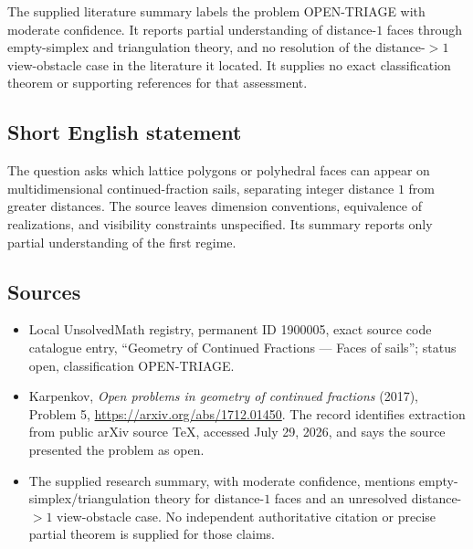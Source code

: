 \documentclass[11pt]{article}
\begin{document}
The supplied literature summary labels the problem OPEN-TRIAGE with moderate confidence. It reports partial understanding of distance-$1$ faces through empty-simplex and triangulation theory, and no resolution of the distance-$>1$ view-obstacle case in the literature it located. It supplies no exact classification theorem or supporting references for that assessment.
\subsection{Short English statement}
The question asks which lattice polygons or polyhedral faces can appear on multidimensional continued-fraction sails, separating integer distance $1$ from greater distances. The source leaves dimension conventions, equivalence of realizations, and visibility constraints unspecified. Its summary reports only partial understanding of the first regime.
\subsection{Sources}
\begin{itemize}
\item Local UnsolvedMath registry, permanent ID 1900005, exact source code catalogue entry, ``Geometry of Continued Fractions --- Faces of sails''; status open, classification OPEN-TRIAGE.
\item Karpenkov, \emph{Open problems in geometry of continued fractions} (2017), Problem 5, \url{https://arxiv.org/abs/1712.01450}. The record identifies extraction from public arXiv source TeX, accessed July 29, 2026, and says the source presented the problem as open.
\item The supplied research summary, with moderate confidence, mentions empty-simplex/triangulation theory for distance-$1$ faces and an unresolved distance-$>1$ view-obstacle case. No independent authoritative citation or precise partial theorem is supplied for those claims.
\end{itemize}
\end{document}

